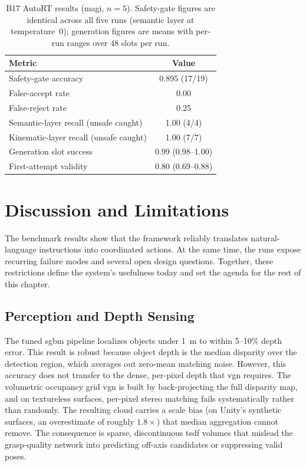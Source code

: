 \documentclass[
     12pt,
     a4paper,
     BCOR=10mm,
     DIV=14,
     listof=totoc,
     bibliography=totoc,
     parskip,
     twoside,
     headsepline
     ]{scrreprt}
\begin{document}
\begin{table}[ht]
	\centering
	\begin{tabular}{lc}
		\hline
		\textbf{Metric}                        & \textbf{Value}    \\
		\hline
		Safety-gate accuracy                   & 0.895 (17/19)     \\
		False-accept rate                      & 0.00              \\
		False-reject rate                      & 0.25              \\
		Semantic-layer recall (unsafe caught)  & 1.00 (4/4)        \\
		Kinematic-layer recall (unsafe caught) & 1.00 (7/7)        \\
		Generation slot success                & 0.99 (0.98--1.00) \\
		First-attempt validity                 & 0.80 (0.69--0.88) \\
		\hline
	\end{tabular}
	\caption{B17 AutoRT results (\gls{magi}, $n=5$). Safety-gate figures are identical across all five runs (semantic layer at temperature~0); generation figures are means with per-run ranges over 48 slots per run.}
	\label{tab:b17-results}
\end{table}

\chapter{Discussion and Limitations}\label{discussion}
The benchmark results show that the framework reliably translates natural-language instructions into coordinated actions. At the same time, the runs expose recurring failure modes and several open design questions. Together, these restrictions define the system's usefulness today and set the agenda for the rest of this chapter.

\section{Perception and Depth Sensing}\label{sec:perception-depth}
The tuned \gls{sgbm} pipeline localizes objects under 1~m to within 5--10\% depth error. This result is robust because object depth is the median disparity over the detection region, which averages out zero-mean matching noise. However, this accuracy does not transfer to the dense, per-pixel depth that \gls{vgn} requires. The volumetric occupancy grid \gls{vgn} is built by back-projecting the full disparity map, and on textureless surfaces, per-pixel stereo matching fails systematically rather than randomly. The resulting cloud carries a scale bias (on Unity's synthetic surfaces, an overestimate of roughly $1.8\times$) that median aggregation cannot remove. The consequence is sparse, discontinuous \gls{tsdf} volumes that mislead the grasp-quality network into predicting off-axis candidates or suppressing valid poses.
\end{document}
